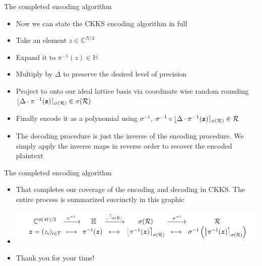 \documentclass{beamer}
\begin{document}
\begin{frame}{The completed encoding algorithm}
	\begin{itemize}[<+->]
		\item Now we can state the CKKS encoding algorithm in full
		\item Take an element $z \in \mathbb{C}^{N/2}$
		\item Expand it to $\pi^{-1}(z) \in \mathbb{H}$
		\item Multiply by $\Delta$ to preserve the desired level of precision
		\item Project to onto our ideal lattice basis via coordinate wise random rounding $\lfloor \Delta \cdot \pi^{-1}({\bf z}) \rceil_{\sigma(\mathcal{R})} \in \sigma(\mathcal{R})$
		\item Finally encode it as a polynomial using $\sigma^{-1}$, $\sigma^{-1 } \circ \lfloor \Delta \cdot \pi^{-1}({\bf z}) \rceil_{\sigma(\mathcal{R})} \in \mathcal{R}$
		\item The decoding procedure is just the inverse of the encoding procedure. We simply apply the inverse maps in reverse order
		to recover the encoded plaintext
	\end{itemize}
\end{frame}

\begin{frame}{The completed encoding algorithm}
	\begin{itemize}[<+->]
		\item That completes our coverage of the encoding and decoding in CKKS. The entire process is summarized succinctly in this
		graphic
		\item \includegraphics[scale=0.35]{encoding_flow.png}
		\item Thank you for your time!
	\end{itemize}
\end{frame}
\end{document}

